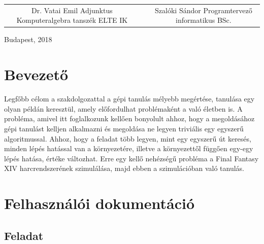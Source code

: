\documentclass[12pt]{article}
\begin{document}
\begin{titlepage}
	\begin{tabular}{cp{1cm}c}
		\begin{minipage}{7cm}
			\vspace{0pt}Dr. Vatai Emil \vspace{10pt} \newline
			Adjunktus \newline
			Komputeralgebra tanszék \newline
			ELTE IK
		\end{minipage} & &
		\begin{minipage}{7cm}
			\vspace{0pt}Szalóki Sándor \vspace{10pt} \newline
			Programtervező informatikus BSc.
		\end{minipage}
	\end{tabular}
		
	
	\vfill
	
	\vspace*{1cm}
	Budapest, 2018
\end{titlepage}

\tableofcontents
\newpage

\section{Bevezető}

Legfőbb célom a szakdolgozattal a gépi tanulás mélyebb megértése, tanulása egy olyan példán keresztül, amely előfordulhat problémaként a való életben is.
\newline
A probléma, amivel itt foglalkozunk kellően bonyolult ahhoz, hogy a megoldásához gépi tanulást kelljen alkalmazni és megoldása ne legyen triviális egy egyszerű algoritmussal.
\newline
Ahhoz, hogy a feladat több legyen, mint egy egyszerű út keresés, minden lépés hatással van a környezetére, illetve a környezettől függően egy-egy lépés hatása, értéke változhat.
\newline
Erre egy kellő nehézségű probléma a Final Fantasy XIV harcrendszerének szimulálása, majd ebben a szimulációban való tanulás.

\pagebreak

\section{Felhasználói dokumentáció}

\subsection{Feladat}
\end{document}
